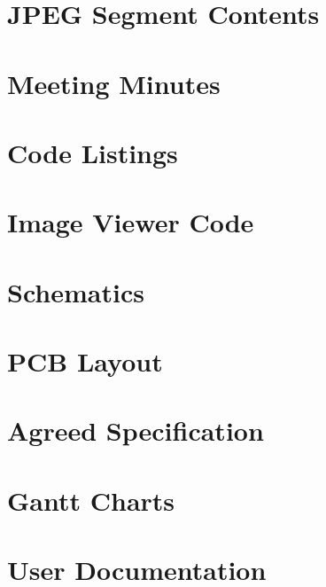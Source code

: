 \documentclass[oneside]{ecsgdp}         %
\begin{document}






%






\appendix
\chapter{JPEG Segment Contents}
\label{chap:jpeg-segment-contents}

\chapter{Meeting Minutes}
\label{chap:meeting_minutes}

\newpage
\chapter{Code Listings}
\label{chap:Matlab_code}

\newpage
\chapter{Image Viewer Code}

\newpage

\newpage

\newpage
\chapter{Schematics}

\newpage

\chapter{PCB Layout}

\newpage

\chapter{Agreed Specification}

\newpage

\chapter{Gantt Charts}

\newpage

\chapter{User Documentation}

\newpage

\backmatter



\newpage

\end{document}
